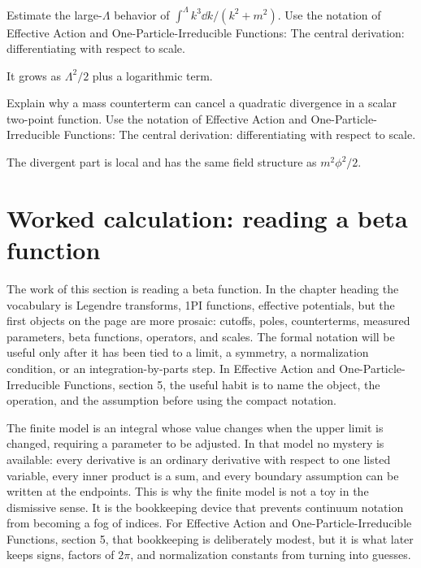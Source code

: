 \begin{exercise}
Estimate the large-\(\Lambda\) behavior of \(\int^\Lambda k^3\dd k/(k^2+m^2)\).  Use the notation of Effective Action and One-Particle-Irreducible Functions: The central derivation: differentiating with respect to scale.
\begin{answer}
It grows as \(\Lambda^2/2\) plus a logarithmic term.
\end{answer}
\end{exercise}

\begin{exercise}
Explain why a mass counterterm can cancel a quadratic divergence in a scalar two-point function.  Use the notation of Effective Action and One-Particle-Irreducible Functions: The central derivation: differentiating with respect to scale.
\begin{answer}
The divergent part is local and has the same field structure as \(m^2\phi^2/2\).
\end{answer}
\end{exercise}



\section{Worked calculation: reading a beta function}

The work of this section is reading a beta function.  In the chapter heading the vocabulary is Legendre transforms, 1PI functions, effective potentials, but the first objects on the page are more prosaic: cutoffs, poles, counterterms, measured parameters, beta functions, operators, and scales.  The formal notation will be useful only after it has been tied to a limit, a symmetry, a normalization condition, or an integration-by-parts step.  In Effective Action and One-Particle-Irreducible Functions, section 5, the useful habit is to name the object, the operation, and the assumption before using the compact notation.

The finite model is an integral whose value changes when the upper limit is changed, requiring a parameter to be adjusted.  In that model no mystery is available: every derivative is an ordinary derivative with respect to one listed variable, every inner product is a sum, and every boundary assumption can be written at the endpoints.  This is why the finite model is not a toy in the dismissive sense.  It is the bookkeeping device that prevents continuum notation from becoming a fog of indices.  For Effective Action and One-Particle-Irreducible Functions, section 5, that bookkeeping is deliberately modest, but it is what later keeps signs, factors of \(2\pi\), and normalization constants from turning into guesses.

